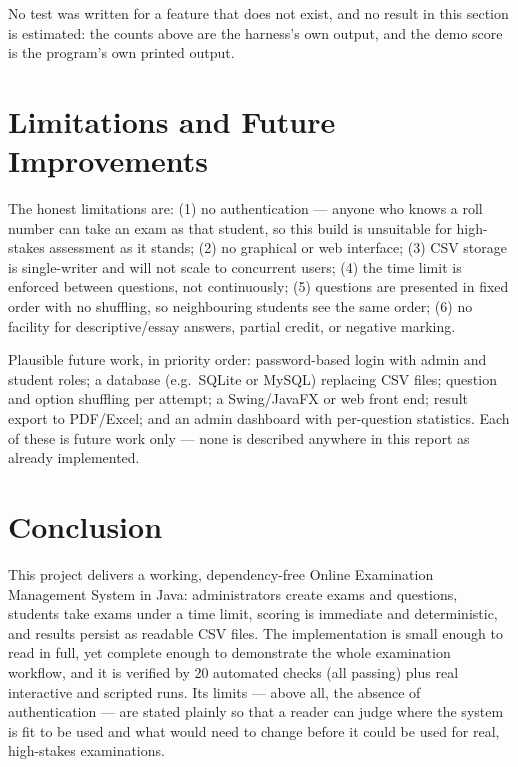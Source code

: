 \documentclass[11pt,a4paper]{article}
\begin{document}
No test was written for a feature that does not exist, and no result in this
section is estimated: the counts above are the harness's own output, and the
demo score is the program's own printed output.

\section{Limitations and Future Improvements}
\label{sec:limitations}
\label{sec:future}
The honest limitations are: (1) no authentication --- anyone who knows a roll
number can take an exam as that student, so this build is unsuitable for
high-stakes assessment as it stands; (2) no graphical or web interface;
(3) CSV storage is single-writer and will not scale to concurrent users;
(4) the time limit is enforced between questions, not continuously; (5) questions
are presented in fixed order with no shuffling, so neighbouring students see the
same order; (6) no facility for descriptive/essay answers, partial credit, or
negative marking.

Plausible future work, in priority order: password-based login with admin and
student roles; a database (e.g.\ SQLite or MySQL) replacing CSV files;
question and option shuffling per attempt; a Swing/JavaFX or web front end;
result export to PDF/Excel; and an admin dashboard with per-question statistics.
Each of these is future work only --- none is described anywhere in this report
as already implemented.

\section{Conclusion}
This project delivers a working, dependency-free Online Examination Management
System in Java: administrators create exams and questions, students take exams
under a time limit, scoring is immediate and deterministic, and results persist
as readable CSV files. The implementation is small enough to read in full, yet
complete enough to demonstrate the whole examination workflow, and it is verified
by 20 automated checks (all passing) plus real interactive and scripted runs.
Its limits --- above all, the absence of authentication --- are stated plainly
so that a reader can judge where the system is fit to be used and what would
need to change before it could be used for real, high-stakes examinations.
\end{document}
